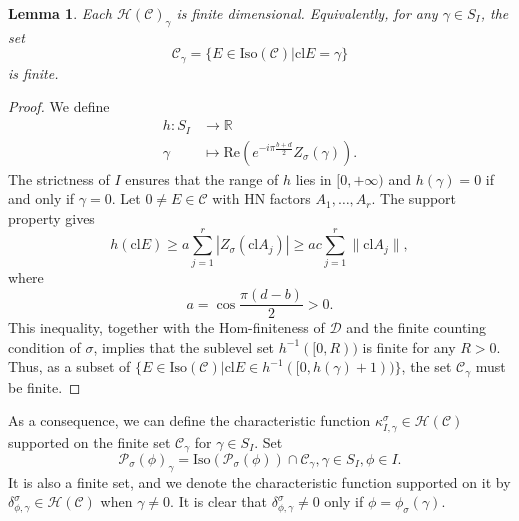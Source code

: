 \documentclass[a4paper,12pt]{amsart}
\numberwithin{equation}{section}
\newtheorem{lemma}[theorem]{Lemma}
\newcommand{\re}{\mathrm{Re}}
\newcommand{\Iso}{\mathrm{Iso}}
\newcommand{\cl}{\mathrm{cl}}
\newcommand{\1}{\mathbf{1}}
\begin{document}
\begin{lemma}\label{sector degree finite}
    Each $\mathcal{H}(\mathcal{C})_\gamma$ is finite dimensional. Equivalently, for any $\gamma\in S_I$, the set
    \[\mathcal{C}_\gamma=\{E\in\Iso(\mathcal{C})|\cl E=\gamma\}\]
    is finite.
\end{lemma}
\begin{proof}
    We define
    \begin{align*}
        h:S_I&\rightarrow\mathbb{R}\\
        \gamma&\mapsto\re(e^{-i\pi\frac{b+d}{2}}Z_\sigma(\gamma)).
    \end{align*}
    The strictness of $I$ ensures that the range of $h$ lies in $[0,+\infty)$ and $h(\gamma)=0$ if and only if $\gamma=0$. Let $0\neq E\in\mathcal{C}$ with HN factors $A_1,\dots,A_r$. The support property gives
    \[h(\cl E)\geqslant a\sum_{j=1}^r|Z_\sigma(\cl A_j)|\geqslant ac\sum_{j=1}^r\|\cl A_j\|,\]
    where
    \[a=\cos\dfrac{\pi(d-b)}{2}>0.\]
    This inequality, together with the Hom-finiteness of $\mathcal{D}$ and the finite counting condition of $\sigma$, implies that the sublevel set $h^{-1}([0,R))$ is finite for any $R>0$. Thus, as a subset of $\{E\in\Iso(\mathcal{C})|\cl E\in h^{-1}([0,h(\gamma)+1))\}$, the set $\mathcal{C}_\gamma$ must be finite.
\end{proof}
As a consequence, we can define the characteristic function $\kappa^\sigma_{I,\gamma}\in\mathcal{H}(\mathcal{C})$ supported on the finite set $\mathcal{C}_\gamma$ for $\gamma\in S_I$. Set
\[\mathcal{P}_\sigma(\phi)_\gamma=\Iso(\mathcal{P}_\sigma(\phi))\cap\mathcal{C}_\gamma,\gamma\in S_I,\phi\in I.\]
It is also a finite set, and we denote the characteristic function supported on it by $\delta^\sigma_{\phi,\gamma}\in\mathcal{H}(\mathcal{C})$ when $\gamma\neq0$. It is clear that $\delta^\sigma_{\phi,\gamma}\neq0$ only if $\phi=\phi_\sigma(\gamma)$.
\end{document}

